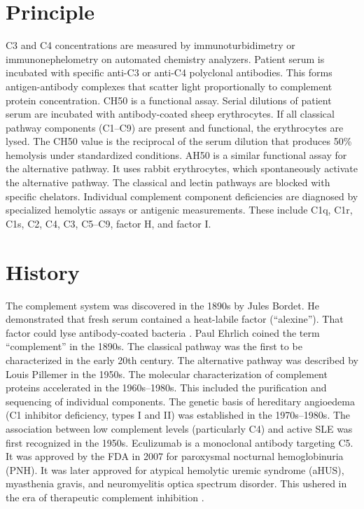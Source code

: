 \section*{Principle}
C3 and C4 concentrations are measured by immunoturbidimetry or immunonephelometry on automated chemistry analyzers. Patient serum is incubated with specific anti-C3 or anti-C4 polyclonal antibodies. This forms antigen-antibody complexes that scatter light proportionally to complement protein concentration. CH50 is a functional assay. Serial dilutions of patient serum are incubated with antibody-coated sheep erythrocytes. If all classical pathway components (C1--C9) are present and functional, the erythrocytes are lysed. The CH50 value is the reciprocal of the serum dilution that produces 50\% hemolysis under standardized conditions. AH50 is a similar functional assay for the alternative pathway. It uses rabbit erythrocytes, which spontaneously activate the alternative pathway. The classical and lectin pathways are blocked with specific chelators. Individual complement component deficiencies are diagnosed by specialized hemolytic assays or antigenic measurements. These include C1q, C1r, C1s, C2, C4, C3, C5--C9, factor H, and factor I.

\section*{History}
The complement system was discovered in the 1890s by Jules Bordet. He demonstrated that fresh serum contained a heat-labile factor (``alexine''). That factor could lyse antibody-coated bacteria \cite{walport2001complement}. Paul Ehrlich coined the term ``complement'' in the 1890s. The classical pathway was the first to be characterized in the early 20th century. The alternative pathway was described by Louis Pillemer in the 1950s. The molecular characterization of complement proteins accelerated in the 1960s--1980s. This included the purification and sequencing of individual components. The genetic basis of hereditary angioedema (C1 inhibitor deficiency, types I and II) was established in the 1970s--1980s. The association between low complement levels (particularly C4) and active SLE was first recognized in the 1950s. Eculizumab is a monoclonal antibody targeting C5. It was approved by the FDA in 2007 for paroxysmal nocturnal hemoglobinuria (PNH). It was later approved for atypical hemolytic uremic syndrome (aHUS), myasthenia gravis, and neuromyelitis optica spectrum disorder. This ushered in the era of therapeutic complement inhibition \cite{walport2001complement2}.

